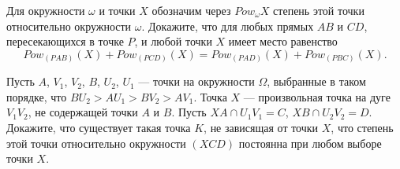 Для окружности $\omega$ и точки $X$ обозначим через $Pow_\omega X$ степень этой точки относительно окружности $\omega$. Докажите, что для любых прямых $AB$ и $CD$, пересекающихся в точке $P$, и любой точки $X$ имеет место равенство $$Pow_{(PAB)}(X)+Pow_{(PCD)}(X)=Pow_{(PAD)}(X)+Pow_{(PBC)}(X).$$

Пусть $A$, $V_1$, $V_2$, $B$, $U_2$, $U_1$ — точки на окружности $\Omega$, выбранные в таком порядке, что $BU_2>AU_1>BV_2>AV_1$. Точка $X$ — произвольная точка на дуге $V_1V_2$, не содержащей точки $A$ и $B$. Пусть $XA\cap U_1V_1=C$, $XB\cap U_2V_2=D$. Докажите, что существует такая точка $K$, не зависящая от точки $X$, что степень этой точки относительно окружности $(XCD)$ постоянна при любом выборе точки $X$.